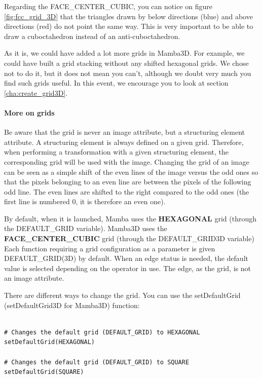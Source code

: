 \documentclass[a4paper,10pt,oneside]{article}
\begin{document}
Regarding the FACE\_CENTER\_CUBIC, you can notice on figure \ref{fig:fcc_grid_3D}
that the triangles drawn by below directions (blue) and above directions (red)
do not point the same way. This is very important to be able to draw a 
cuboctahedron instead of an anti-cuboctahedron.

As it is, we could have added a lot more grids in Mamba3D. For example,
we could have built a grid stacking without any shifted hexagonal grids.
We chose not to do it, but it does not mean you can't, although we doubt very
much you find such grids useful. In this event, we encourage you to look
at section \ref{cha:create_grid3D}.

\paragraph{More on grids}

Be aware that the grid is never an image attribute, but a structuring element 
attribute. A structuring element is always defined on a given grid. Therefore, 
when performing a transformation with a given structuring element, the corresponding 
grid will be used with the image. Changing the grid of an image can be seen as a 
simple shift of the even lines of the image versus the odd ones so that the pixels 
belonging to an even line are between the pixels of the following odd line. The even 
lines are shifted to the right compared to the odd ones (the first line is numbered 0, 
it is therefore an even one).

By default, when it is launched, Mamba uses the \textbf{HEXAGONAL} grid (through 
the DEFAULT\_GRID variable). Mamba3D uses the \textbf{FACE\_CENTER\_CUBIC} grid
(through the DEFAULT\_GRID3D variable)  Each function requiring a grid
configuration as a parameter is given DEFAULT\_GRID(3D) by default. When an
edge status is needed, the default value is selected depending on the operator
in use. The edge, as the grid, is not an image attribute.

There are different ways to change the grid. You can use the setDefaultGrid 
(setDefaultGrid3D for Mamba3D) function:

\lstset{language=Python}
\begin{lstlisting}

# Changes the default grid (DEFAULT_GRID) to HEXAGONAL
setDefaultGrid(HEXAGONAL)

# Changes the default grid (DEFAULT_GRID) to SQUARE
setDefaultGrid(SQUARE)
\end{lstlisting}
\end{document}
